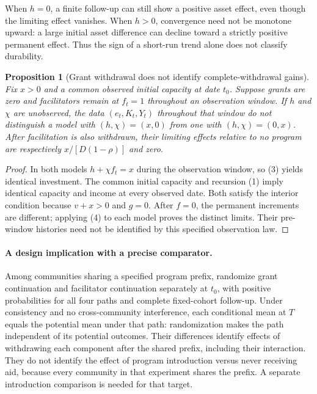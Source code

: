 \documentclass[11pt]{article}
\newtheorem{proposition}[theorem]{Proposition}
\theoremstyle{definition}
\begin{document}
When $h=0$, a finite follow-up can still show a positive asset effect, even though the limiting effect vanishes. When $h>0$, convergence need not be monotone upward: a large initial asset difference can decline toward a strictly positive permanent effect. Thus the sign of a short-run trend alone does not classify durability.

\begin{proposition}[Grant withdrawal does not identify complete-withdrawal gains]
Fix $x>0$ and a common observed initial capacity at date $t_0$. Suppose grants are zero and facilitators remain at $f_t=1$ throughout an observation window. If $h$ and $\chi$ are unobserved, the data $(e_t,K_t,Y_t)$ throughout that window do not distinguish a model with $(h,\chi)=(x,0)$ from one with $(h,\chi)=(0,x)$. After facilitation is also withdrawn, their limiting effects relative to no program are respectively $x/[D(1-\rho)]$ and zero.
\end{proposition}
\begin{proof}
In both models $h+\chi f_t=x$ during the observation window, so (3) yields identical investment. The common initial capacity and recursion (1) imply identical capacity and income at every observed date. Both satisfy the interior condition because $v+x>0$ and $g=0$. After $f=0$, the permanent increments are different; applying (4) to each model proves the distinct limits. Their pre-window histories need not be identified by this specified observation law.
\end{proof}

\paragraph{A design implication with a precise comparator.}
Among communities sharing a specified program prefix, randomize grant continuation and facilitator continuation separately at $t_0$, with positive probabilities for all four paths and complete fixed-cohort follow-up. Under consistency and no cross-community interference, each conditional mean at $T$ equals the potential mean under that path: randomization makes the path independent of its potential outcomes. Their differences identify effects of withdrawing each component after the shared prefix, including their interaction. They do not identify the effect of program introduction versus never receiving aid, because every community in that experiment shares the prefix. A separate introduction comparison is needed for that target.
\end{document}
